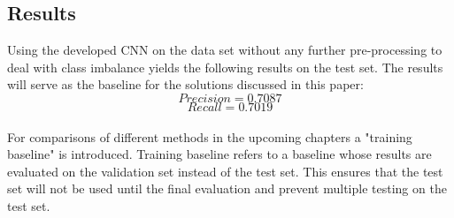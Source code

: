 \subsection{Results}
Using the developed CNN on the data set without any further pre-processing to deal with class imbalance yields the following results on the test set. The results will serve as the baseline for the solutions discussed in this paper: \\
\begin{equation}
Precision = 0.7087
\end{equation}
\begin{equation}
Recall = 0.7019
\end{equation}
\\
For comparisons of different methods in the upcoming chapters a "training baseline" is introduced. Training baseline refers to a baseline whose results are evaluated on the validation set instead of the test set. This ensures that the test set will not be used until the final evaluation and prevent multiple testing on the test set.
